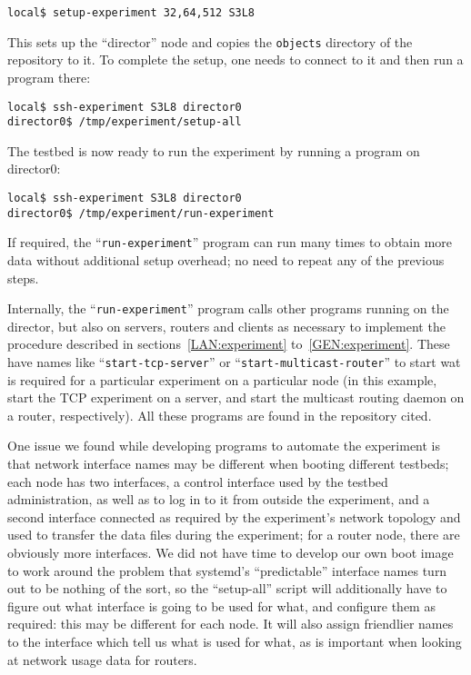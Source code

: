 \documentclass[a4paper,12pt]{article}
\begin{document}
\begin{verbatim}
local$ setup-experiment 32,64,512 S3L8
\end{verbatim}

This sets up the ``director'' node and copies the {\tt objects} directory
of the repository to it.  To complete the setup, one needs to connect to
it and then run a program there:

\begin{verbatim}
local$ ssh-experiment S3L8 director0
director0$ /tmp/experiment/setup-all
\end{verbatim}

The testbed is now ready to run the experiment by running a program on
director0:

\begin{verbatim}
local$ ssh-experiment S3L8 director0
director0$ /tmp/experiment/run-experiment
\end{verbatim}

If required, the ``{\tt run-experiment}'' program can run many times
to obtain more data without additional setup overhead; no need to
repeat any of the previous steps.

Internally, the ``{\tt run-experiment}'' program calls other programs
running on the director, but also on servers, routers and clients
as necessary to implement the procedure described in
sections~\ref{LAN:experiment} to~\ref{GEN:experiment}. These
have names like ``{\tt start-tcp-server}'' or
``{\tt start-multicast-router}'' to start wat is required for
a particular experiment on a particular node (in this example,
start the TCP experiment on a server, and start the multicast
routing daemon on a router, respectively).  All these programs are
found in the repository cited.

One issue we found while developing programs to automate the experiment
is that network interface names may be different when booting
different testbeds; each node has two interfaces, a control
interface used by the testbed administration, as well as to log
in to it from outside the experiment, and a second interface
connected as required by the experiment's network topology and
used to transfer the data files during the experiment; for a router
node, there are obviously more interfaces.  We did not have time
to develop our own boot image to work around the problem that
systemd's ``predictable'' interface names turn out to be nothing
of the sort, so the ``setup-all'' script will additionally have
to figure out what interface is going to be used for what, and
configure them as required: this may be different for each node.
It will also assign friendlier names to the interface which tell
us what is used for what, as is important when looking at network
usage data for routers.
\end{document}
